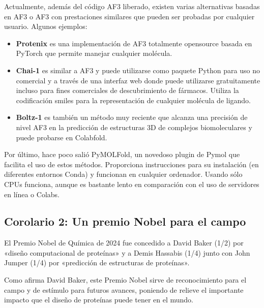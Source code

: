 Actualmente, además del código AF3 liberado, existen varias alternativas basadas en AF3 o AF3 con prestaciones similares que pueden ser probadas por cualquier usuario. Algunos ejemplos:
\begin{itemize}
\item \textbf{Protenix} es una implementación de AF3 totalmente opensource basada en PyTorch que permite manejar cualquier molécula.
\item \textbf{Chai-1} es similar a AF3 y puede utilizarse como paquete Python para uso no comercial y a través de una interfaz web donde puede utilizarse gratuitamente incluso para fines comerciales de descubrimiento de fármacos. Utiliza la codificación smiles para la representación de cualquier molécula de ligando.
\item \textbf{Boltz-1} es también un método muy reciente que alcanza una precisión de nivel AF3 en la predicción de estructuras 3D de complejos biomoleculares y puede probarse en Colabfold.
\end{itemize}

Por último, hace poco salió PyMOLFold, un novedoso plugin de Pymol que facilita el uso de estos métodos. Proporciona instrucciones para su instalación (en diferentes entornos Conda) y funcionan en cualquier ordenador. Usando sólo CPUs funciona, aunque es bastante lento en comparación con el uso de servidores en línea o Colabs.

\subsection{Corolario 2: Un premio Nobel para el campo}
El Premio Nobel de Química de 2024 fue concedido a David Baker (1/2) por «diseño computacional de proteínas» y a Demis Hassabis (1/4) junto con John Jumper (1/4) por «predicción de estructuras de proteínas».

Como afirma David Baker, este Premio Nobel sirve de reconocimiento para el campo y de estímulo para futuros avances, poniendo de relieve el importante impacto que el diseño de proteínas puede tener en el mundo.
